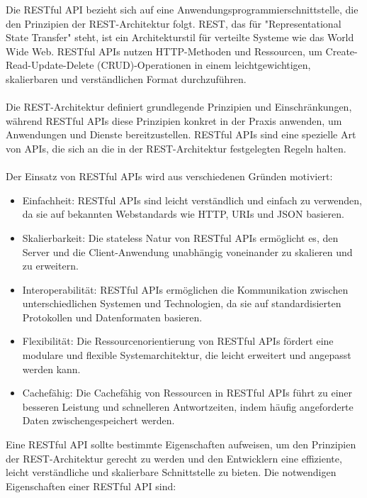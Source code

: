 Die RESTful API bezieht sich auf eine Anwendungsprogrammierschnittstelle, die den Prinzipien der REST-Architektur folgt. REST, das für "Representational State Transfer" steht, ist ein Architekturstil für verteilte Systeme wie das World Wide Web. RESTful APIs nutzen HTTP-Methoden und Ressourcen, um Create-Read-Update-Delete (CRUD)-Operationen in einem leichtgewichtigen, skalierbaren und verständlichen Format durchzuführen.
\\\\
Die REST-Architektur definiert grundlegende Prinzipien und Einschränkungen, während RESTful APIs diese Prinzipien konkret in der Praxis anwenden, um Anwendungen und Dienste bereitzustellen. RESTful APIs sind eine spezielle Art von APIs, die sich an die in der REST-Architektur festgelegten Regeln halten.
\\\\
Der Einsatz von RESTful APIs wird aus verschiedenen Gründen motiviert:
\begin{itemize}
\item Einfachheit: RESTful APIs sind leicht verständlich und einfach zu verwenden, da sie auf bekannten Webstandards wie HTTP, URIs und JSON basieren.
\item Skalierbarkeit: Die stateless Natur von RESTful APIs ermöglicht es, den Server und die Client-Anwendung unabhängig voneinander zu skalieren und zu erweitern.
\item Interoperabilität: RESTful APIs ermöglichen die Kommunikation zwischen unterschiedlichen Systemen und Technologien, da sie auf standardisierten Protokollen und Datenformaten basieren.
\item Flexibilität: Die Ressourcenorientierung von RESTful APIs fördert eine modulare und flexible Systemarchitektur, die leicht erweitert und angepasst werden kann.
\item Cachefähig: Die Cachefähig von Ressourcen in RESTful APIs führt zu einer besseren Leistung und schnelleren Antwortzeiten, indem häufig angeforderte Daten zwischengespeichert werden.
\end{itemize}
Eine RESTful API sollte bestimmte Eigenschaften aufweisen, um den Prinzipien der REST-Architektur gerecht zu werden und den Entwicklern eine effiziente, leicht verständliche und skalierbare Schnittstelle zu bieten. Die notwendigen Eigenschaften einer RESTful API sind:
